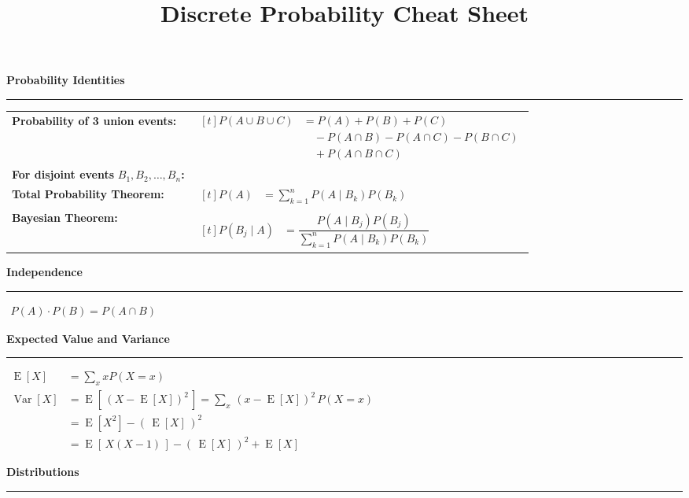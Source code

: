 \documentclass[11pt, a4paper]{article}
\title{Discrete Probability Cheat Sheet}
\author{}
\date{}
\newcommand{\myP}[1]{P\left(#1\right)}
\newcommand{\myPMF}[2][X]{\myP{#1 = #2}}
\newcommand{\myExpect}[1]{\operatorname{E}\left[#1\right]}
\newcommand{\myVariance}[1]{\operatorname{Var}\left[#1\right]}
\begin{document}
\textbf{Probability Identities}
\hrule

\begin{tabular}{ll}
\textbf{Probability of 3 union events:}
    & $\begin{aligned}[t]
        \myP{A \cup B \cup C} &= \myP{A} + \myP{B} + \myP{C} \\
            &\quad - \myP{A \cap B} - \myP{A \cap C} - \myP{B \cap C} \\
            &\quad + \myP{A \cap B \cap C} 
    \end{aligned}$ \\ \addlinespace[1ex]
\textbf{For disjoint events }$B_1, B_2, \dots, B_n$\textbf{: } & \\ \addlinespace[1ex]
\qquad \textbf{Total Probability Theorem:} 
    & $\begin{aligned}[t] 
        \myP{A} &= \textstyle\sum_{k=1}^n \myP{A \mid B_k} \myP{B_k}
    \end{aligned}$ \\ \addlinespace[1ex]
\qquad \textbf{Bayesian Theorem:} 
    & $\begin{aligned}[t]
        \myP{B_j \mid A} &= \dfrac{ \myP{A \mid B_j} \myP{B_j} }{ \sum_{k=1}^{n} \myP{A \mid B_k} \myP{B_k} }
    \end{aligned}$ \\
\end{tabular}

\vspace{5pt}
\textbf{Independence}
\hrule

$\begin{aligned}
    \myP{A} \cdot \myP{B} = \myP{A \cap B}
\end{aligned}$

\vspace{5pt}
\textbf{Expected Value and Variance}
\hrule

$\begin{aligned}
    \myExpect{X} &= \sum_{x} x \myPMF{x} \\
    \myVariance{X} &= \myExpect{\,\left(X - \myExpect{X}\right)^2\,} = \sum_{x} \,\left(x - \myExpect{X}\right)^2\, \myPMF{x} \\
        &= \myExpect{X^2} - \left(\,\myExpect{X}\,\right)^2 \\
        &= \myExpect{\,X\left(X-1\right)\,} - \left(\,\myExpect{X}\,\right)^2 + \myExpect{X}
\end{aligned}$

\newpage
\vspace{5pt}
\textbf{Distributions} \vspace{2pt}
\hrule
\end{document}
